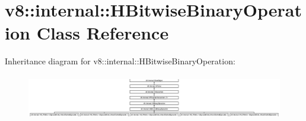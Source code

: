 \hypertarget{classv8_1_1internal_1_1_h_bitwise_binary_operation}{}\section{v8\+:\+:internal\+:\+:H\+Bitwise\+Binary\+Operation Class Reference}
\label{classv8_1_1internal_1_1_h_bitwise_binary_operation}
Inheritance diagram for v8\+:\+:internal\+:\+:H\+Bitwise\+Binary\+Operation\+:\begin{figure}[H]
\begin{center}
\leavevmode
\includegraphics[height=2.000000cm]{classv8_1_1internal_1_1_h_bitwise_binary_operation}
\end{center}
\end{figure}
